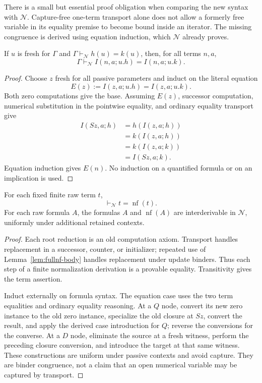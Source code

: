 There is a small but essential proof obligation when comparing the new
syntax with $\mathcal N$.  Capture-free one-term transport alone does not
allow a formerly free variable in its equality premise to become bound
inside an iterator.  The missing congruence is derived using equation
induction, which $\mathcal N$ already proves.

\begin{lemma}
\label{lem:fullnf-body}
If $u$ is fresh for $\Gamma$ and
$\Gamma\vdash_{\mathcal N}h(u)=k(u)$, then, for all terms $n,a$,
\[
 \Gamma\vdash_{\mathcal N}I(n,a;u.h)=I(n,a;u.k).
\]
\end{lemma}
\begin{proof}
Choose $z$ fresh for all passive parameters and induct on the literal equation
\[
 E(z):=I(z,a;u.h)=I(z,a;u.k).
\]
Both zero computations give the base.  Assuming $E(z)$, successor
computation, numerical substitution in the pointwise equality, and ordinary
equality transport give
\[
\begin{aligned}
 I(Sz,a;h)&=h(I(z,a;h))\\
          &=k(I(z,a;h))\\
          &=k(I(z,a;k))\\
          &=I(Sz,a;k).
\end{aligned}
\]
Equation induction gives $E(n)$.  No induction on a quantified formula
or on an implication is used.
\end{proof}

\begin{lemma}
\label{lem:fullnf-provable}
For each fixed finite raw term $t$,
\[
 \vdash_{\mathcal N}t=\operatorname{nf}(t).
\]
For each raw formula $A$, the formulas $A$ and $\operatorname{nf}(A)$ are
interderivable in $\mathcal N$, uniformly under additional retained contexts.
\end{lemma}
\begin{proof}
Each root reduction is an old computation axiom.  Transport handles
replacement in a successor, counter, or initializer; repeated use of
Lemma~\ref{lem:fullnf-body} handles replacement under update binders.
Thus each step of a finite normalization derivation is a provable equality.
Transitivity gives the term assertion.

Induct externally on formula syntax.  The equation case uses the two term
equalities and ordinary equality reasoning.  At a $Q$ node, convert its
new zero instance to the old zero instance, specialize the old closure at
$Sz$, convert the result, and apply the derived case introduction for $Q$;
reverse the conversions for the converse.  At a $D$ node, eliminate the
source at a fresh witness, perform the preceding closure conversion, and
introduce the target at that same witness.  These constructions are uniform
under passive contexts and avoid capture.  They are binder congruence,
not a claim that an open numerical variable may be captured by transport.
\end{proof}

